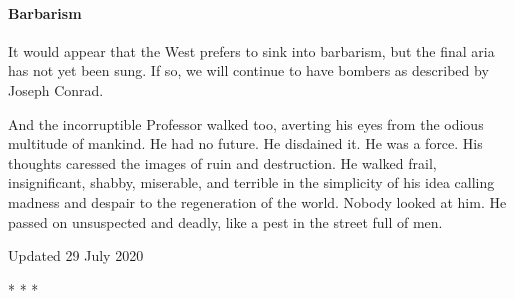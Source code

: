 \paragraph{Barbarism}


It would appear that the West prefers to sink into barbarism, but the final aria has not yet been sung. If so, we will continue to have bombers as described by Joseph Conrad.

\begin{quotex}
And the incorruptible Professor walked too, averting his eyes from the odious multitude of mankind. He had no future. He disdained it. He was a force. His thoughts caressed the images of ruin and destruction. He walked frail, insignificant, shabby, miserable, and terrible in the simplicity of his idea calling madness and despair to the regeneration of the world. Nobody looked at him. He passed on unsuspected and deadly, like a pest in the street full of men.
\end{quotex}

Updated 29 July 2020



\begin{center}* * *\end{center}

